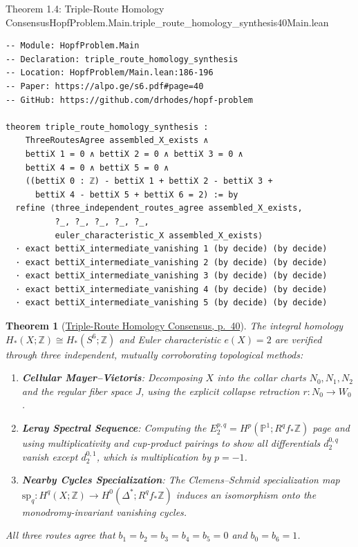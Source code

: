 \documentclass[10pt]{article}
\newtheorem{theorem}{Theorem}[section]
\newcommand{\dbZ}{\mathbb{Z}}
\newcommand{\dbP}{\mathbb{P}}
\gdef\hashchar{#}
\newcommand{\paperref}[2]{\href{https://alpo.ge/s6.pdf\hashchar page=#1}{#2}}
\begin{document}
\begin{comparativeblock}{Theorem 1.4: Triple-Route Homology Consensus}{HopfProblem.Main.triple_route_homology_synthesis}{40}{Main.lean}
\begin{verbatim}
-- Module: HopfProblem.Main
-- Declaration: triple_route_homology_synthesis
-- Location: HopfProblem/Main.lean:186-196
-- Paper: https://alpo.ge/s6.pdf#page=40
-- GitHub: https://github.com/drhodes/hopf-problem

theorem triple_route_homology_synthesis :
    ThreeRoutesAgree assembled_X_exists ∧
    bettiX 1 = 0 ∧ bettiX 2 = 0 ∧ bettiX 3 = 0 ∧
    bettiX 4 = 0 ∧ bettiX 5 = 0 ∧
    ((bettiX 0 : ℤ) - bettiX 1 + bettiX 2 - bettiX 3 +
      bettiX 4 - bettiX 5 + bettiX 6 = 2) := by
  refine ⟨three_independent_routes_agree assembled_X_exists,
          ?_, ?_, ?_, ?_, ?_,
          euler_characteristic_X assembled_X_exists⟩
  · exact bettiX_intermediate_vanishing 1 (by decide) (by decide)
  · exact bettiX_intermediate_vanishing 2 (by decide) (by decide)
  · exact bettiX_intermediate_vanishing 3 (by decide) (by decide)
  · exact bettiX_intermediate_vanishing 4 (by decide) (by decide)
  · exact bettiX_intermediate_vanishing 5 (by decide) (by decide)
\end{verbatim}
\tcblower
\begin{theorem}[\paperref{40}{Triple-Route Homology Consensus, p.~40}]\label{thm:triple-route}
The integral homology $H_*(X;\dbZ) \cong H_*(S^6;\dbZ)$ and Euler characteristic $e(X) = 2$ are verified through three independent, mutually corroborating topological methods:
\begin{enumerate}[label=(\alph*), itemsep=1pt, parsep=0pt]
    \item \textbf{Cellular Mayer--Vietoris}: Decomposing $X$ into the collar charts $N_0, N_1, N_2$ and the regular fiber space $J$, using the explicit collapse retraction $r\colon N_0 \to W_0$.
    \item \textbf{Leray Spectral Sequence}: Computing the $E_2^{p,q} = H^p(\dbP^1; R^q f_* \dbZ)$ page and using multiplicativity and cup-product pairings to show all differentials $d_2^{0,q}$ vanish except $d_2^{0,1}$, which is multiplication by $p = -1$.
    \item \textbf{Nearby Cycles Specialization}: The Clemens--Schmid specialization map $\mathrm{sp}_q\colon H^q(X;\dbZ) \to H^0(\Delta^*; R^q f_* \dbZ)$ induces an isomorphism onto the monodromy-invariant vanishing cycles.
\end{enumerate}
All three routes agree that $b_1 = b_2 = b_3 = b_4 = b_5 = 0$ and $b_0 = b_6 = 1$.
\end{theorem}
\end{comparativeblock}
\end{document}
